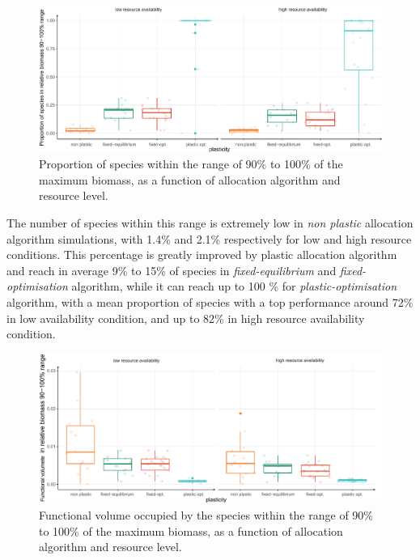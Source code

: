 \begin{figure}\label{fig:species_richness}
\includegraphics[width = \textwidth]{./2_PP/Figures/Landscape/plot_eveness.pdf}
\caption{Proportion of species within the range of 90\% to 100\% of the maximum biomass, as a function of allocation algorithm and resource level.}
\end{figure}

The number of species within this range is extremely low in \textit{non plastic} allocation algorithm simulations, with 1.4\% and 2.1\% respectively for low and high resource conditions. This percentage is greatly improved by plastic allocation algorithm and reach in average 9\% to 15\% of species in \textit{fixed-equilibrium} and \textit{fixed-optimisation} algorithm, while it can reach up to 100 \% for \textit{plastic-optimisation} algorithm, with a mean proportion of species with a top performance around 72\% in low availability condition, and up to 82\% in high resource availability condition.

\begin{figure}\label{fig:function_div}
\includegraphics[width = \textwidth]{./2_PP/Figures/Landscape/plot_fdiv.pdf}
\caption{Functional volume occupied by the species within the range of 90\% to 100\% of the maximum biomass, as a function of allocation algorithm and resource level.}
\end{figure}

